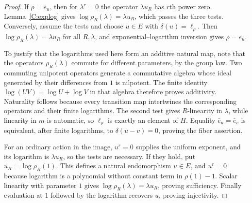 \begin{proof}
If $\rho=\bar e_u$, then for $\lambda^r=0$ the operator $\lambda u_R$ has $r$th power zero. Lemma~\ref{C:explog} gives $\log\rho_R(\lambda)=\lambda u_R$, which passes the three tests. Conversely, assume the tests and choose $u\in E$ with $\delta(u)=\ell_\rho$. Then $\log\rho_R(\lambda)=\lambda u_R$ for all $R,\lambda$, and exponential--logarithm inversion gives $\rho=\bar e_u$.

To justify that the logarithms used here form an additive natural map, note that the operators $\rho_R(\lambda)$ commute for different parameters, by the group law. Two commuting unipotent operators generate a commutative algebra whose ideal generated by their differences from $1$ is nilpotent. The finite identity $\log(UV)=\log U+\log V$ in that algebra therefore proves additivity. Naturality follows because every transition map intertwines the corresponding operators and their finite logarithms. The second test gives $R$-linearity in $\lambda$, while linearity in $m$ is automatic, so $\ell_\rho$ is exactly an element of $H$. Equality $\bar e_u=\bar e_v$ is equivalent, after finite logarithms, to $\delta(u-v)=0$, proving the fiber assertion.

For an ordinary action in the image, $u^r=0$ supplies the uniform exponent, and its logarithm is $\lambda u_R$, so the tests are necessary. If they hold, put $u_R=\log\rho_R(1)$. This defines a natural endomorphism $u\in E$, and $u^r=0$ because logarithm is a polynomial without constant term in $\rho(1)-1$. Scalar linearity with parameter $1$ gives $\log\rho_R(\lambda)=\lambda u_R$, proving sufficiency. Finally evaluation at $1$ followed by the logarithm recovers $u$, proving injectivity.
\end{proof}

